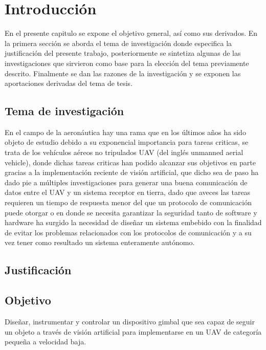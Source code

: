 \chapter{Introducción}
En el presente capitulo se expone el objetivo general, así como sus derivados. En la
primera sección se aborda el tema de investigación donde especifica la justificación del
presente trabajo, posteriormente se sintetiza algunas de las investigaciones que sirvieron
como base para la elección del tema previamente descrito. Finalmente se dan las razones
de la investigación y se exponen las aportaciones derivadas del tema de tesis.

\section{Tema de investigación}
En el campo de la aeronáutica hay una rama que en los últimos años ha sido objeto
de estudio debido a su exponencial importancia para tareas criticas, se trata de los
vehículos aéreos no tripulados UAV (del inglés unmanned aerial vehicle), donde dichas 
tareas criticas han podido alcanzar sus objetivos en parte gracias a la implementación
reciente de visión artificial, que dicho sea de paso ha dado pie a múltiples investigaciones
para generar una buena comunicación de datos entre el UAV y un sistema receptor en
tierra, dado que aveces las tareas requieren un tiempo de respuesta menor del que un
protocolo de comunicación puede otorgar o en donde se necesita garantizar la seguridad
tanto de software y hardware ha surgido la necesidad de diseñar un sistema embebido
con la finalidad de evitar los problemas relacionados con los protocolos de comunicación
y a su vez tener como resultado un sistema enteramente autónomo.

\section{Justificación}


\section{Objetivo}
Diseñar, instrumentar y controlar un dispositivo gimbal que sea capaz de seguir un objeto a través de visión artificial para implementarse en un UAV de categoría pequeña a velocidad baja.


